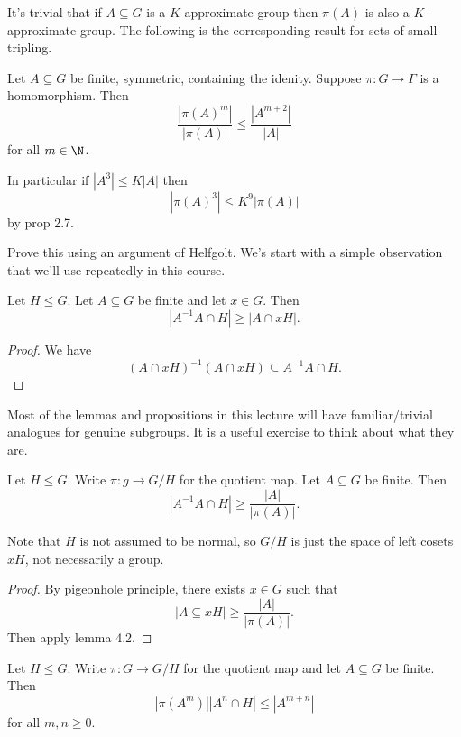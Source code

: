 \documentclass[a4paper]{article}
\begin{document}
It's trivial that if \(A \subseteq G\) is a \(K\)-approximate group then \(\pi(A)\) is also a \(K\)-approximate group. The following is the corresponding result for sets of small tripling.

\begin{proposition}
  Let \(A \subseteq G\) be finite, symmetric, containing the idenity. Suppose \(\pi: G \to \Gamma\) is a homomorphism. Then
  \[
    \frac{|\pi(A)^m|}{|\pi(A)|} \leq \frac{|A^{m + 2}|}{|A|}
  \]
  for all \(m \in \N\).

  In particular if \(|A^3| \leq K |A|\) then
  \[
    |\pi(A)^3| \leq K^9 |\pi(A)|
  \]
  by prop 2.7.
\end{proposition}

Prove this using an argument of Helfgolt. We's  start with a simple observation that we'll use repeatedly in this course.

\begin{lemma}[lemma 4.2]
  Let \(H \leq G\). Let \(A \subseteq G\) be finite and let \(x \in G\). Then
  \[
    |A^{-1}A \cap H| \geq |A \cap xH|.
  \]
\end{lemma}

\begin{proof}
  We have
  \[
    (A \cap xH)^{-1} (A \cap xH) \subseteq A^{-1}A \cap H.
  \]
\end{proof}

\begin{remark}
  Most of the lemmas and propositions in this lecture will have familiar/trivial analogues for genuine subgroups. It is a useful exercise to think about what they are.
\end{remark}

\begin{lemma}[lemma 4.3]
  Let \(H \leq G\). Write \(\pi: g \to G/H\) for the quotient map. Let \(A \subseteq G\) be finite. Then
  \[
    |A^{-1}A \cap H| \geq \frac{|A|}{|\pi(A)|}.
  \]
\end{lemma}

Note that \(H\) is not assumed to be normal, so \(G/H\) is just the space of left cosets \(xH\), not necessarily a group.

\begin{proof}
  By pigeonhole principle, there exists \(x \in G\) such that
  \[
    |A \subseteq x H| \geq \frac{|A|}{|\pi(A)|}.
  \]
  Then apply lemma 4.2.
\end{proof}

\begin{lemma}[lemma 4.4]
  Let \(H \leq G\). Write \(\pi: G \to G/H\) for the quotient map and let \(A \subseteq G\) be finite. Then
  \[
    |\pi(A^m)| |A^n \cap H| \leq |A^{m + n}|
  \]
  for all \(m, n \geq 0\).
\end{lemma}
\end{document}
